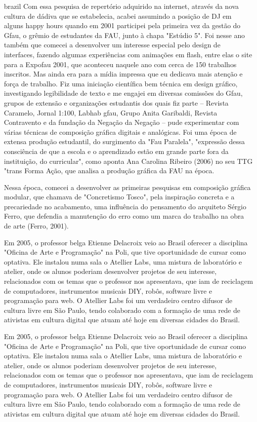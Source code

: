 \begin{otherlanguage*}{brazil}
Com essa pesquisa de repertório adquirido na internet, através da nova cultura de dádiva que se estabelecia, acabei assumindo a posição de DJ em alguns happy hours quando em 2001 participei pela primeira vez da gestão do Gfau, o grêmio de estudantes da FAU, junto à chapa "Estúdio 5". Foi nesse ano também que comecei a desenvolver um interesse especial pelo design de interfaces, fazendo algumas experiências com animações em flash, entre elas o site para a Expofau 2001, que aconteceu naquele ano com cerca de 150 trabalhos inscritos. Mas ainda era para a mídia impressa que eu dedicava mais atenção e força de trabalho. Fiz uma iniciação científica bem técnica em design gráfico, investigando legibilidade de texto e me engajei em diversas comissões do Gfau, grupos de extensão e organizações estudantis dos quais fiz parte – Revista Caramelo, Jornal 1:100, Labhab gfau, Grupo Anita Garibaldi, Revista Contravento e da fundação da Negação da Negação – pude experimentar com várias técnicas de composição gráfica digitais e analógicas. Foi uma época de extensa produção estudantil, do surgimento da "Fau Paralela", "expressão dessa consciência de que a escola e o aprendizado estão em grande parte fora da instituição, do curricular", como aponta Ana Carolina Ribeiro (2006) no seu TTG "trans Forma Ação, que analisa a produção gráfica da FAU na época. 

Nessa época, comecei a desenvolver as primeiras pesquisas em composição gráfica modular, que chamava de "Concretismo Tosco", pela inspiração concreta e a precariedade no acabamento, uma influência do pensamento do arquiteto Sérgio Ferro, que defendia a manutenção do erro como um marca do trabalho na obra de arte (Ferro, 2001). 

Em 2005, o professor belga Etienne Delacroix veio ao Brasil oferecer a disciplina "Oficina de Arte e Programação" na Poli, que tive oportunidade de cursar como optativa. Ele instalou numa sala o Atellier Labs, uma mistura de laboratório e atelier, onde os alunos poderiam desenvolver projetos de seu interesse, relacionados com os temas que o professor nos apresentava, que iam de reciclagem de computadores, instrumentos musicais DIY, robôs, software livre e programação para web. O Atellier Labs foi um verdadeiro centro difusor de cultura livre em São Paulo, tendo colaborado com a formação de uma rede de ativistas em cultura digital que atuam até hoje em diversas cidades do Brasil. 

Em 2005, o professor belga Etienne Delacroix veio ao Brasil oferecer a disciplina "Oficina de Arte e Programação" na Poli, que tive oportunidade de cursar como optativa. Ele instalou numa sala o Atellier Labs, uma mistura de laboratório e atelier, onde os alunos poderiam desenvolver projetos de seu interesse, relacionados com os temas que o professor nos apresentava, que iam de reciclagem de computadores, instrumentos musicais DIY, robôs, software livre e programação para web. O Atellier Labs foi um verdadeiro centro difusor de cultura livre em São Paulo, tendo colaborado com a formação de uma rede de ativistas em cultura digital que atuam até hoje em diversas cidades do Brasil. 


\end{otherlanguage*}
